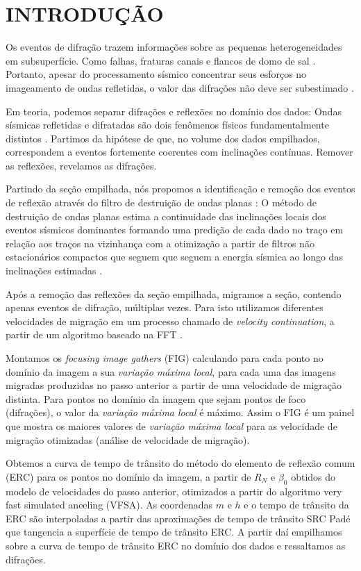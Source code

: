 \chapter{INTRODUÇÃO}
\label{intro}

Os eventos de difração trazem informações sobre as pequenas heterogeneidades em subsuperfície. Como falhas, fraturas
canais e flancos de domo de sal \cite{sep_dif}.
Portanto, apesar do processamento sísmico concentrar seus esforços no imageamento de ondas refletidas, o valor das
difrações não deve ser subestimado \cite{khaidukov}.

Em teoria, podemos separar difrações e reflexões no domínio dos dados: Ondas sísmicas refletidas e difratadas são
dois fenômenos físicos fundamentalmente distintos \cite{klen}. Partimos da hipótese de que, no volume dos dados
empilhados, correspondem a eventos fortemente coerentes com inclinações contínuas. Remover as reflexões, revelamos
as difrações.


Partindo da seção empilhada, nós propomos a identificação e remoção dos eventos de reflexão 
através do filtro de destruição de ondas planas 
\cite{claerbout}: O método de destruição de ondas planas estima a continuidade das inclinações 
locais dos eventos sísmicos dominantes
formando uma predição de cada dado no traço em relação aos traços na vizinhança com a otimização a partir de
filtros não estacionários compactos que seguem que seguem a energia sísmica ao longo das inclinações estimadas
\cite{sep_dif}.

Após a remoção das reflexões da seção empilhada, migramos a seção,
contendo apenas eventos de difração, múltiplas vezes. Para isto utilizamos
diferentes velocidades de migração em um processo chamado de \textit{velocity continuation}, a partir de um algoritmo baseado
na FFT \cite{sep_dif}.

Montamos os \textit{focusing image gathers} (FIG) calculando para cada ponto no domínio 
da imagem a sua \textit{variação máxima local},
para cada uma das imagens migradas produzidas no passo anterior a partir de uma velocidade de migração distinta. 
Para pontos no domínio da imagem que sejam pontos de foco (difrações), o valor da \textit{variação máxima local} é máximo. 
Assim o FIG é um painel que mostra os maiores valores de \textit{variação máxima local} 
para as velocidade de migração otimizadas (análise de velocidade de migração).

Obtemos a curva de tempo de trânsito do método do elemento de reflexão comum (ERC) para os pontos no domínio da imagem,
a partir de $R_N$ e $\beta_0$ obtidos do modelo de velocidades do passo anterior, otimizados a partir do algoritmo
very fast simulated aneeling (VFSA).
As coordenadas $m$ e $h$ e o tempo de trânsito da ERC são interpoladas a partir das aproximações
de tempo de trânsito SRC Padé \cite{neves} que tangencia a superfície de tempo de trânsito ERC.
A partir daí empilhamos sobre a curva de tempo de trânsito ERC no domínio dos dados e ressaltamos as difrações.